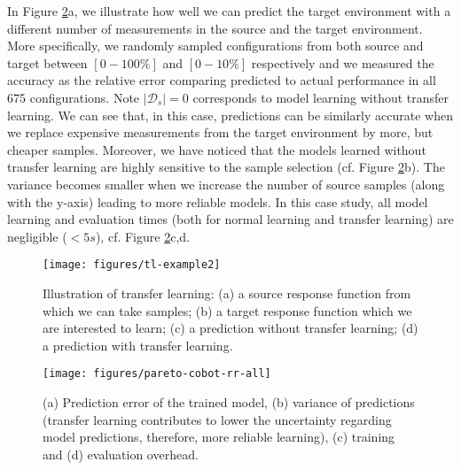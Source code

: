 In Figure \ref{fig:pareto-cobot-mean-variance}a, we illustrate how well we can predict the target
environment with a different number of measurements in the source
and the target environment. More specifically, we randomly sampled configurations from both source and target between $[0-100\%]$ and $[0-10\%]$ respectively and we measured the accuracy as the relative error comparing predicted to actual performance in all 675 configurations. Note $|\mathcal{D}_s| = 0$ corresponds to model learning without transfer learning.
We can see that, in this case, predictions can be similarly accurate when we replace
expensive measurements from the target environment
by more, but cheaper samples.
Moreover, we have noticed that the models learned without transfer learning are highly sensitive to the sample selection (cf. Figure \ref{fig:pareto-cobot-mean-variance}b). The variance becomes smaller when we increase the number of source samples (along with the y-axis) leading to more reliable models.
In this case study, all model learning and evaluation times (both for normal learning and transfer learning) are negligible ($<5s$), cf. Figure \ref{fig:pareto-cobot-mean-variance}c,d.


\begin{figure}[t]
	\begin{center}
		\texttt{[image: figures/tl-example2]}
		\caption{Illustration of transfer learning: (a) a source response function from which we can take samples; (b) a target response function which we are interested to learn; (c) a prediction without transfer learning; (d) a prediction with transfer learning.}
		\label{fig:example}
	\end{center}
\end{figure}

\begin{figure}[t]
	\begin{center}
		\texttt{[image: figures/pareto-cobot-rr-all]}
		\caption{(a) Prediction error of the trained model, (b) variance of predictions (transfer learning contributes to lower the uncertainty regarding model predictions, therefore, more reliable learning), (c) training and (d) evaluation overhead.}
		\label{fig:pareto-cobot-mean-variance}
	\end{center}
\end{figure}




